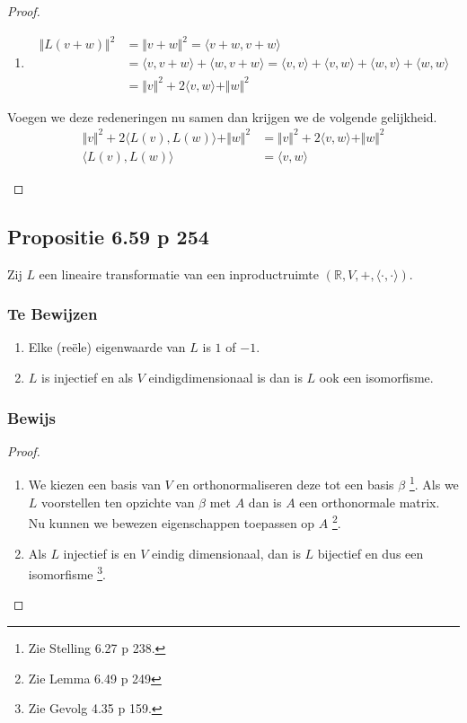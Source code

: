 \documentclass[lineaire_algebra_oplossingen.tex]{subfiles}
\begin{document}
\begin{proof}
\begin{itemize}
\begin{enumerate}
\item
\begin{align*}
\Vert L(v+w) \Vert^2
&= \Vert v+w \Vert^2
= \langle v+w,v+w\rangle \\
&= \langle v,v+w\rangle + \langle w,v+w\rangle
= \langle v,v\rangle + \langle v,w\rangle + \langle w,v\rangle + \langle w,w\rangle \\
&= \Vert v\Vert^2 + 2\langle v,w \rangle +\Vert w\Vert^2
\end{align*}
\end{enumerate}
Voegen we deze redeneringen nu samen dan krijgen we de volgende gelijkheid.
\begin{align*}
\Vert v\Vert^2 + 2\langle L(v),L(w) \rangle +\Vert w\Vert^2 &= \Vert v\Vert^2 + 2\langle v,w \rangle +\Vert w\Vert^2 \\
\langle L(v),L(w) \rangle &=\langle v,w \rangle
\end{align*}
\end{itemize}
\end{proof}


\subsection{Propositie 6.59 p 254}
\label{6.59}
Zij $L$ een lineaire transformatie van een inproductruimte $(\mathbb{R},V,+,\langle \cdot,\cdot \rangle)$.

\subsubsection*{Te Bewijzen}
\begin{enumerate}
\item Elke (re\"ele) eigenwaarde van $L$ is $1$ of $-1$.

\item $L$ is injectief en als $V$ eindigdimensionaal is dan is $L$ ook een isomorfisme.
\end{enumerate}

\subsubsection*{Bewijs}
\begin{proof}
\begin{enumerate}
\item
We kiezen een basis van $V$ en orthonormaliseren deze tot een basis $\beta$ \footnote{Zie Stelling 6.27 p 238.}. Als we $L$ voorstellen ten opzichte van $\beta$ met $A$ dan is $A$ een orthonormale matrix.
Nu kunnen we bewezen eigenschappen toepassen op $A$ \footnote{Zie Lemma 6.49 p 249}.

\item
Als $L$ injectief is en $V$ eindig dimensionaal, dan is $L$ bijectief en dus een isomorfisme \footnote{Zie Gevolg 4.35 p 159.}.
\end{enumerate}
\end{proof}
\end{document}

